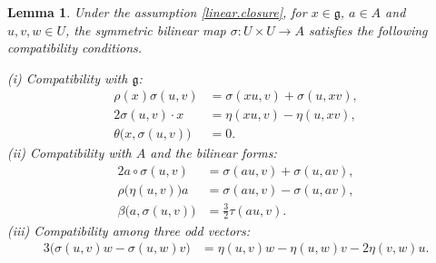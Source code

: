 \documentclass[12pt]{article}
\numberwithin{equation}{section}
\newtheorem{lemma}[theorem]{Lemma}
\theoremstyle{definition}
\theoremstyle{plain}
\newcommand{\subno}[1]{\noindent\textnormal{(#1)}}
\newcommand{\fg}{\mathfrak{g}}
\begin{document}
\begin{lemma}\label{lem:sigma.compat}
Under the assumption \eqref{linear.closure}, for $x\in\fg$, $a\in A$ and $u,v,w\in U$, the symmetric bilinear map $\sigma:U\times U\rightarrow A$ satisfies the following compatibility conditions.

    \subno{i} Compatibility with $\fg$\textup{:}
    \begin{align}
    \rho(x)\sigma(u,v)&=\sigma(xu,v)+\sigma(u,xv),\label{sigma.g}\\
    2\sigma(u,v)\cdot x&=\eta(xu,v)-\eta(u,xv),\label{sigma.x}\\
    \theta\big(x,\sigma(u,v)\big)&=0.\label{sigma.theta}
    \end{align}
    \subno{ii} Compatibility with $A$ and the bilinear forms\textup{:}
    \begin{align}
    2a\circ\sigma(u,v)&=\sigma(au,v)+\sigma(u,av),\label{sigma.A}\\
    \rho\big(\eta(u,v)\big)a&=\sigma(au,v)-\sigma(u,av),\label{sigma.rho}\\
    \beta\big(a,\sigma(u,v)\big)&=\frac32\tau(au,v).\label{sigma.beta}
    \end{align}
    \subno{iii} Compatibility among three odd vectors\textup{:}
    \begin{align}
    3\big(\sigma(u,v)w-\sigma(u,w)v\big)&=\eta(u,v)w-\eta(u,w)v-2\eta(v,w)u.\label{sigma.uvw}
\end{align}
\end{lemma}
\end{document}

